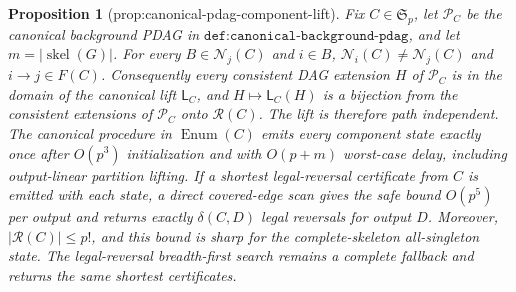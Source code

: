 \documentclass{article}
\newtheorem{proposition}{Proposition}
\begin{document}
\begin{proposition}[prop:canonical-pdag-component-lift]\label{prop:canonical-pdag-component-lift}
Fix \(C\in\mathfrak S_p\), let \(\mathcal P_C\) be the canonical background PDAG in \(\texttt{def:canonical-background-pdag}\), and let \(m=|\operatorname{skel}(G)|\). For every \(B\in\mathcal N_j(C)\) and \(i\in B\), \(\mathcal N_i(C)\neq\mathcal N_j(C)\) and \(i\to j\in F(C)\). Consequently every consistent DAG extension \(H\) of \(\mathcal P_C\) is in the domain of the canonical lift \(\mathsf L_C\), and \(H\mapsto\mathsf L_C(H)\) is a bijection from the consistent extensions of \(\mathcal P_C\) onto \(\mathcal R(C)\). The lift is therefore path independent. The canonical procedure in \(\operatorname{Enum}(C)\) emits every component state exactly once after \(O(p^3)\) initialization and with \(O(p+m)\) worst-case delay, including output-linear partition lifting. If a shortest legal-reversal certificate from \(C\) is emitted with each state, a direct covered-edge scan gives the safe bound \(O(p^5)\) per output and returns exactly \(\delta(C,D)\) legal reversals for output \(D\). Moreover, \(|\mathcal R(C)|\leq p!\), and this bound is sharp for the complete-skeleton all-singleton state. The legal-reversal breadth-first search remains a complete fallback and returns the same shortest certificates.
\end{proposition}
\end{document}
